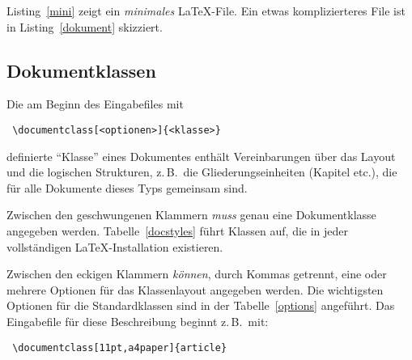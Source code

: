 Listing~\ref{mini} zeigt ein \emph{minimales} \LaTeX-File. Ein etwas
komplizierteres File ist in Listing~\ref{dokument} skizziert.




\subsection{Dokumentklassen}\label{docsty}

Die am Beginn des Eingabefiles  mit
\begin{lstlisting}
 \documentclass[<optionen>]{<klasse>}
\end{lstlisting}
definierte "`Klasse"' eines Dokumentes enthält Vereinbarungen über das Layout
und die logischen Strukturen, z.\,B.\ die Gliederungseinheiten (Kapitel etc.\@),
die für alle Dokumente dieses Typs gemeinsam sind.

Zwischen den geschwungenen Klammern \emph{muss} genau eine Dokumentklasse
angegeben werden.  Tabelle~\vref{docstyles} führt
Klassen auf, die in jeder vollständigen \LaTeX-Installation existieren.

Zwischen den eckigen Klammern \emph{können}, durch Kommas getrennt, eine oder
mehrere Optionen für das Klassenlayout angegeben werden. Die wichtigsten
Optionen für die Standardklassen sind in der Tabelle~\vref{options} angeführt.
Das Eingabefile für diese Beschreibung beginnt z.\,B.\ mit:
\begin{lstlisting}
 \documentclass[11pt,a4paper]{article}
\end{lstlisting}



